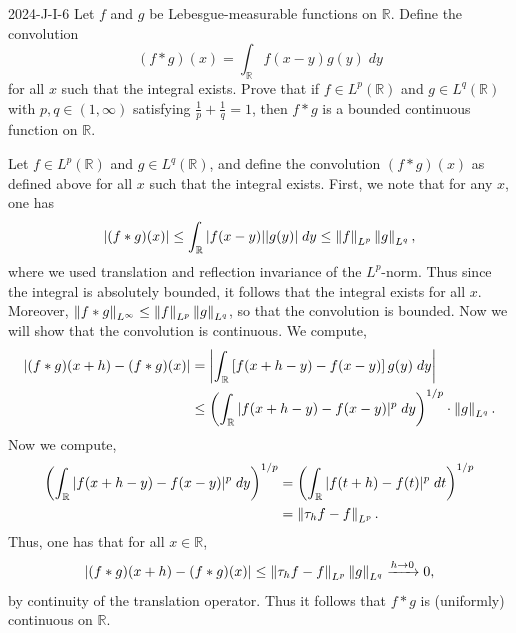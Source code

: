 \documentclass{article}
\begin{document}
	\begin{prb}{2024-J-I-6}
		Let $f$ and $g$ be Lebesgue-measurable functions on $\mathbb{R}$. Define the convolution 
		\begin{equation*}
			(f \ast g)(x) = \int_{\mathbb{R}}f(x-y)g(y)\;dy
		\end{equation*}
		for all $x$ such that the integral exists. Prove that if $f \in L^p(\mathbb{R})$ and $g \in L^q(\mathbb{R})$ with $p, q \in (1,\infty)$ satisfying $\frac{1}{p} + \frac{1}{q} = 1$, then $f \ast g$ is a bounded continuous function on $\mathbb{R}$. 
	\end{prb}
	Let $f \in L^p(\mathbb{R})$ and $g \in L^q(\mathbb{R})$, and define the convolution $(f \ast g)(x)$ as defined above for all $x$ such that the integral exists. First, we note that for any $x$, one has 
	\begin{equation*}
		\left| (f \ast g)(x) \right| \leq \int_{\mathbb{R}}|f(x-y)||g(y)|\;dy \leq \left\Vert f \right\Vert_{L^p}\left\Vert g \right\Vert_{L^q}, 
	\end{equation*}
	where we used translation and reflection invariance of the $L^p$-norm. Thus since the integral is absolutely bounded, it follows that the integral exists for all $x$. Moreover, $\left\Vert f \ast g \right\Vert_{L^\infty} \leq \left\Vert f \right\Vert_{L^p}\left\Vert g \right\Vert_{L^q}$, so that the convolution is bounded. Now we will show that the convolution is continuous. We compute, 
	\begin{align*}
		\begin{split}
			|(f \ast g)(x + h) - (f \ast g)(x)| &= \left| \int_{\mathbb{R}}\left[f(x + h - y) - f(x - y)\right]g(y)\;dy \right| \\
			&\leq \left(\int_{\mathbb{R}}|f(x + h - y) - f(x - y)|^{p}\;dy\right)^{1/p} \cdot \left\Vert g \right\Vert_{L^q}. 
		\end{split}
	\end{align*}
	Now we compute, 
	\begin{align*}
		\begin{split}
			\left(\int_{\mathbb{R}}|f(x + h - y) - f(x - y)|^{p}\;dy\right)^{1/p} &= \left(\int_{\mathbb{R}}|f(t + h) - f(t)|^p\;dt\right)^{1/p} \\
			&= \left\Vert \tau_hf - f \right\Vert_{L^p}. 
		\end{split}
	\end{align*}
	Thus, one has that for all $x \in \mathbb{R}$, 
	\begin{equation*}
		|(f \ast g)(x + h) - (f \ast g)(x)| \leq \left\Vert \tau_hf - f \right\Vert_{L^p}\left\Vert g \right\Vert_{L^q} \xrightarrow{h \to 0} 0, 
	\end{equation*}
	by continuity of the translation operator. Thus it follows that $f \ast g$ is (uniformly) continuous on $\mathbb{R}$. 
\end{document}

